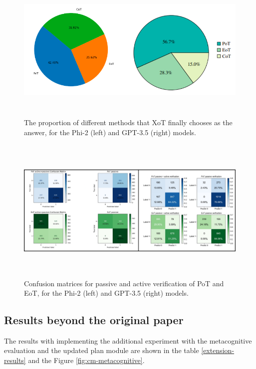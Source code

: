 \documentclass[10pt]{article} %
\begin{document}
  \begin{figure}[h]
    \begin{center}
    \includegraphics[height=7cm]{graphs/graph1.png}
    \end{center}
    \caption{The proportion of different methods that XoT finally chooses as the answer, for the Phi-2 (left) and GPT-3.5 (right) models.}
    \label{fig:proportion}
    \end{figure}

    \begin{figure}[h]
      \begin{center}
      \includegraphics[height=7cm,width=16.5cm]{graphs/cm_merged.png}
      \end{center}
      \caption{Confusion matrices for passive and active verification of PoT and EoT, for the Phi-2 (left) and GPT-3.5 (right) models.}
      \label{fig:cm}
      \end{figure}


\subsection{Results beyond the original paper}
The results with implementing the additional experiment with the metacognitive evaluation and the updated plan module are shown in the table \ref{extension-results} and the Figure \ref{fig:cm-metacognitive}.
\end{document}
